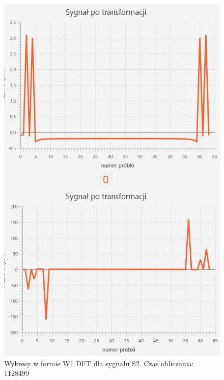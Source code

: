 \documentclass[12pt]{article}
\begin{document}
\begin{figure}[H]
	\centering
	\includegraphics[width=.8\linewidth]{DFT-S2-W1}
	\caption{Wykresy w formie W1 DFT dla sygnału S2. Czas obliczania: 1128499}
	\label{S3_sygnal}
\end{figure}
\end{document}
